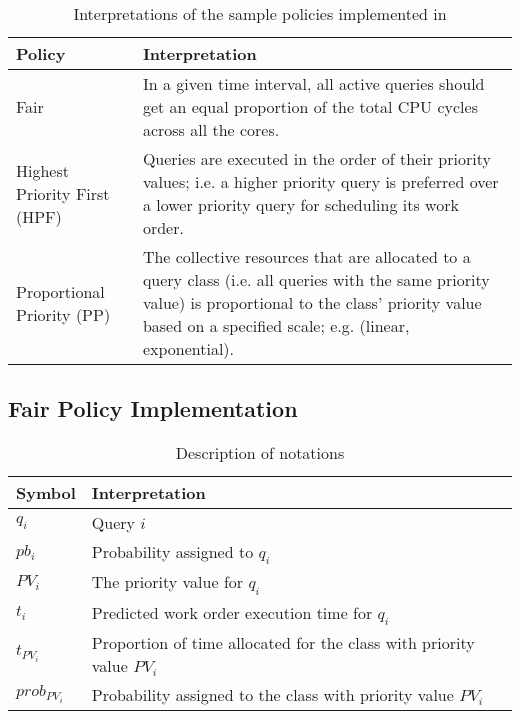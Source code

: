 \begin{table}[t]
\centering
\begin{tabular}{|p{1.3cm}|p{6.5cm}|}
\hline
\textbf{Policy} & \textbf{Interpretation} \\ \hline
Fair & In a given time interval, all active queries should get an equal proportion of the total CPU cycles across all the cores. \\ \hline%
Highest Priority First (HPF) & 
Queries are executed in the order of their priority values; i.e. a higher priority query is preferred over a lower priority query for scheduling its work order. \\ \hline
Proportional Priority (PP) & 
The collective resources that are allocated to a query class (i.e. all queries with the same priority value) is proportional to the class' priority value based on a specified scale; e.g. (linear, exponential).
\\ \hline
\end{tabular}
\caption{Interpretations of the sample policies implemented in \sys{}}
\label{table:policy-interpreatations}
	\vspace{-2.8em}
\end{table}

\subsection{Fair Policy Implementation}\label{ssec:fairness}
\begin{table}[t]
	\centering
	\begin{tabular}{|p{}|p{}|}
		\hline
		\textbf{Symbol} & \textbf{Interpretation} \\ \hline
		$q_{i}$ & Query $i$ \\ \hline
		$pb_{i}$ & Probability assigned to $q_{i}$ \\ \hline
		$PV_{i}$ & The priority value for $q_{i}$ \\ \hline
		$t_{i}$ & Predicted work order execution time for $q_{i}$ \\ \hline
		$t_{PV_{i}}$ & Proportion of time allocated for the class with priority value $PV_{i}$ \\ \hline
		$prob_{PV_{i}}$ & Probability assigned to the class with priority value $PV_{i}$ \\ \hline
	\end{tabular}
	\vspace{0.4em}
	\caption{Description of notations}
	\label{table:policy-notations}
	\vspace{-2.8em}
\end{table}

